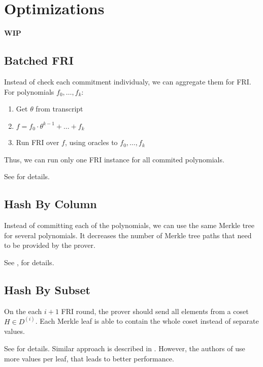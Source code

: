 \section{Optimizations}
\label{section:optimizations}
\textbf{WIP}

\subsection{Batched FRI}

Instead of check each commitment individualy, we can aggregate them for FRI.
For polynomials $f_0, \dots, f_k$:
\begin{enumerate}
    \item Get $\theta$ from transcript
    \item $f = f_0 \cdot \theta^{k - 1} + \dots + f_k$
    \item Run FRI over $f$, using oracles to $f_0, \dots, f_k$
\end{enumerate}

Thus, we can run only one FRI instance for all commited polynomials.

See \cite{cryptoeprint:2019:1400} for details.

\subsection{Hash By Column}

Instead of committing each of the polynomials, we can use the same Merkle tree for several polynomials. 
It decreases the number of Merkle tree paths that need to be provided by the prover. 

See \cite{cryptoeprint:2019:1076}, \cite{cryptoeprint:2019:1400} for details.

\subsection{Hash By Subset}

On the each $i + 1$ FRI round, the prover should send all elements from a coset $H \in D^{(i)}$.
Each Merkle leaf is able to contain the whole coset instead of separate values. 

See \cite{cryptoeprint:2019:1076} for details.
Similar approach is described in \cite{cryptoeprint:2019:1400}.
However, the authors of \cite{cryptoeprint:2019:1400} use more values per leaf, that leads to better performance. 
